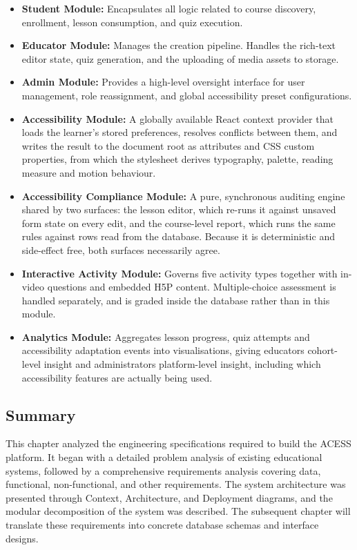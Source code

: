 \documentclass[12pt, oneside]{article} %
\newcommand{\tcode}[1]{\path{#1}}
\begin{document}
\begin{itemize}
    \item \textbf{Student Module:} Encapsulates all logic related to course discovery, enrollment, lesson consumption, and quiz execution.
    \item \textbf{Educator Module:} Manages the creation pipeline. Handles the rich-text editor state, quiz generation, and the uploading of media assets to storage.
    \item \textbf{Admin Module:} Provides a high-level oversight interface for user management, role reassignment, and global accessibility preset configurations.
    \item \textbf{Accessibility Module:} A globally available React context provider that loads the learner's stored preferences, resolves conflicts between them, and writes the result to the document root as \tcode{data-*} attributes and CSS custom properties, from which the stylesheet derives typography, palette, reading measure and motion behaviour.
    \item \textbf{Accessibility Compliance Module:} A pure, synchronous auditing engine shared by two surfaces: the lesson editor, which re-runs it against unsaved form state on every edit, and the course-level report, which runs the same rules against rows read from the database. Because it is deterministic and side-effect free, both surfaces necessarily agree.
    \item \textbf{Interactive Activity Module:} Governs five activity types together with in-video questions and embedded H5P content. Multiple-choice assessment is handled separately, and is graded inside the database rather than in this module.
    \item \textbf{Analytics Module:} Aggregates lesson progress, quiz attempts and accessibility adaptation events into visualisations, giving educators cohort-level insight and administrators platform-level insight, including which accessibility features are actually being used.
\end{itemize}

\subsection{Summary}

This chapter analyzed the engineering specifications required to build the ACESS platform. It began with a detailed problem analysis of existing educational systems, followed by a comprehensive requirements analysis covering data, functional, non-functional, and other requirements. The system architecture was presented through Context, Architecture, and Deployment diagrams, and the modular decomposition of the system was described. The subsequent chapter will translate these requirements into concrete database schemas and interface designs.
\end{document}
